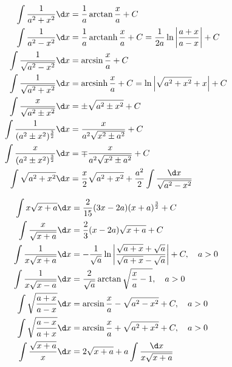\begin{example}[带 $a^2 \pm x^2$]
	\[ \begin{aligned}
			\int \frac{1}{a^2+x^2} \d x                     & = \frac{1}{a} \arctan \frac{x}{a} + C                                                        \\
			\int \frac{1}{a^2 - x^2} \d x                   & = \frac{1}{a} \arctanh \frac{x}{a} + C  = \frac{1}{2a} \ln \left| \frac{a+x}{a-x}\right| + C \\
			\int \frac{1}{\sqrt{a^2 - x^2}} \d x            & = \arcsin \frac{x}{a} + C                                                                    \\
			\int \frac{1}{\sqrt{a^2 + x^2}} \d x            & = \arcsinh \frac{x}{a} + C  = \ln \left| \sqrt{a^2 + x^2} + x \right|  + C                   \\
			\int \frac{x}{\sqrt{a^2 \pm x^2}} \d x          & = \pm\sqrt{a^2 \pm x^2} + C                                                                  \\
			\int \frac{1}{(a^2 \pm x^2)^{\frac{3}{2}}} \d x & = \frac{x}{a^2\sqrt{x^2 \pm a^2}} + C                                                        \\
			\int \frac{x}{(a^2 \pm x^2)^{\frac{3}{2}}} \d x & = \mp \frac{x}{a^2\sqrt{x^2 \pm a^2}} + C                                                    \\
			\int \sqrt{a^2 + x^2} \d x                      & = \frac{x}{2}  \sqrt{a^2+x^2}+\frac{a^2}{2} \int \frac{\d x}{\sqrt{a^2-x^2}}
		\end{aligned} \]
\end{example}

\begin{example}[根式]
	\[ \begin{aligned}
			\int x \sqrt{x+a} \d x           & = \frac{2}{15} (3x - 2a) (x+a)^{\frac{3}{2}} + C                                                                   \\
			\int \frac{x}{\sqrt{x+a}} \d x   & = \frac{2}{3} (x - 2a) \sqrt{x+a} + C                                                                              \\
			\int \frac{1}{x\sqrt{x+a}} \d x  & = -\frac{1}{\sqrt{a}} \ln \left| \frac{\sqrt{a + x} + \sqrt{a}}{\sqrt{a + x} - \sqrt{a}} \right| + C , \quad a > 0 \\
			\int \frac{1}{x\sqrt{x-a}} \d x  & = \frac{2}{\sqrt{a}}\arctan \sqrt{\frac{x}{a}-1}, \quad a > 0                                                      \\
			\int \sqrt{\frac{a+x}{a-x}} \d x & = \arcsin \frac{x}{a} - \sqrt{a^2 - x^2} + C, \quad a > 0                                                          \\
			\int \sqrt{\frac{a-x}{a+x}} \d x & = \arcsin \frac{x}{a} + \sqrt{a^2 + x^2} + C, \quad a > 0                                                          \\
			\int \frac{\sqrt{x+a}}{x} \d x   & = 2 \sqrt{x+a} + a \int \frac{\d x}{x \sqrt{x+a}}
		\end{aligned} \]
\end{example}

